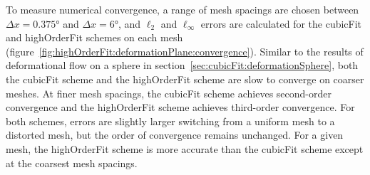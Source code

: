 To measure numerical convergence, a range of mesh spacings are chosen between $\Delta x = \ang{0.375}$ and $\Delta x = \ang{6}$, and $\ell_2$ and $\ell_\infty$ errors are calculated for the cubicFit and highOrderFit schemes on each mesh (figure~\ref{fig:highOrderFit:deformationPlane:convergence}).
Similar to the results of deformational flow on a sphere in section~\ref{sec:cubicFit:deformationSphere}, both the cubicFit scheme and the highOrderFit scheme are slow to converge on coarser meshes.
At finer mesh spacings, the cubicFit scheme achieves second-order convergence and the highOrderFit scheme achieves third-order convergence.
For both schemes, errors are slightly larger switching from a uniform mesh to a distorted mesh, but the order of convergence remains unchanged.
For a given mesh, the highOrderFit scheme is more accurate than the cubicFit scheme except at the coarsest mesh spacings.

